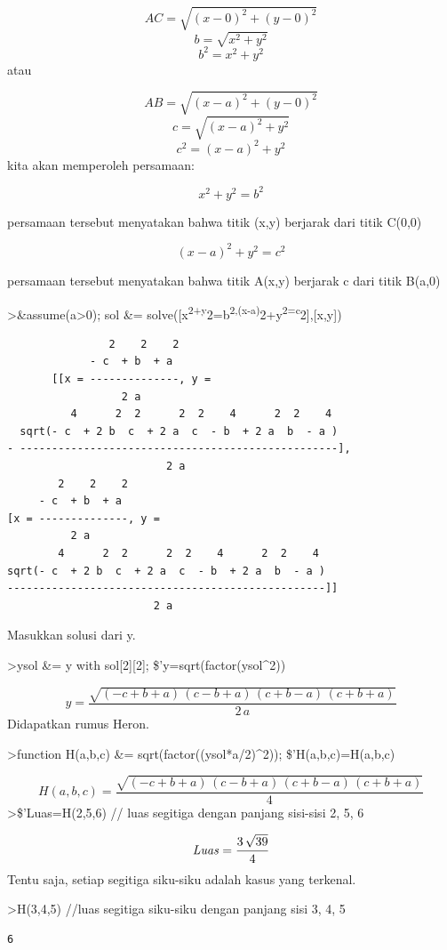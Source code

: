 \documentclass[
]{book}
\begin{document}
\[AC=\sqrt{(x-0)^2+(y-0)^2}\]\[b=\sqrt{x^2+y^2}\]\[b^2=x^2+y^2\]atau

\[AB=\sqrt{(x-a)^2+(y-0)^2}\]\[c=\sqrt{(x-a)^2+y^2}\]\[c^2=(x-a)^2+y^2\]kita akan memperoleh persamaan:

\[x^2+y^2=b^2\]

persamaan tersebut menyatakan bahwa titik (x,y) berjarak dari titik C(0,0)

\[(x-a)^2+y^2=c^2\]

persamaan tersebut menyatakan bahwa titik A(x,y) berjarak c dari titik B(a,0)

\textgreater\&assume(a\textgreater0); sol \&= solve({[}x\textsuperscript{2+y}2=b\textsuperscript{2,(x-a)}2+y\textsuperscript{2=c}2{]},{[}x,y{]})

\begin{verbatim}
                2    2    2
             - c  + b  + a
       [[x = --------------, y = 
                  2 a
          4      2  2      2  2    4      2  2    4
  sqrt(- c  + 2 b  c  + 2 a  c  - b  + 2 a  b  - a )
- --------------------------------------------------], 
                         2 a
        2    2    2
     - c  + b  + a
[x = --------------, y = 
          2 a
        4      2  2      2  2    4      2  2    4
sqrt(- c  + 2 b  c  + 2 a  c  - b  + 2 a  b  - a )
--------------------------------------------------]]
                       2 a
\end{verbatim}

Masukkan solusi dari y.

\textgreater ysol \&= y with sol{[}2{]}{[}2{]}; \$'y=sqrt(factor(ysol\^{}2))

\[y=\frac{\sqrt{\left(-c+b+a\right)\,\left(c-b+a\right)\,\left(c+b-a  \right)\,\left(c+b+a\right)}}{2\,a}\]Didapatkan rumus Heron.

\textgreater function H(a,b,c) \&= sqrt(factor((ysol*a/2)\^{}2)); \$'H(a,b,c)=H(a,b,c)

\[H\left(a , b , c\right)=\frac{\sqrt{\left(-c+b+a\right)\,\left(c-b+  a\right)\,\left(c+b-a\right)\,\left(c+b+a\right)}}{4}\]\textgreater\$'Luas=H(2,5,6) // luas segitiga dengan panjang sisi-sisi 2, 5, 6

\[{\it Luas}=\frac{3\,\sqrt{39}}{4}\]Tentu saja, setiap segitiga siku-siku adalah kasus yang terkenal.

\textgreater H(3,4,5) //luas segitiga siku-siku dengan panjang sisi 3, 4, 5

\begin{verbatim}
6
\end{verbatim}
\end{document}
